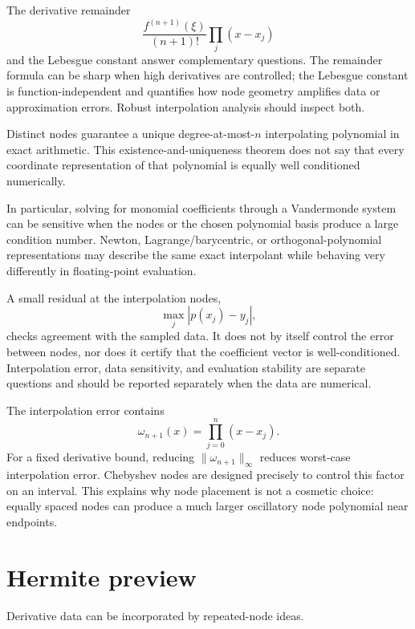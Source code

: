\begin{remark}
The derivative remainder
\[
\frac{f^{(n+1)}(\xi)}{(n+1)!}\prod_j(x-x_j)
\]
and the Lebesgue constant answer complementary questions. The remainder formula can be sharp when high derivatives are controlled; the Lebesgue constant is function-independent and quantifies how node geometry amplifies data or approximation errors. Robust interpolation analysis should inspect both.
\end{remark}

\begin{remark}
Distinct nodes guarantee a unique degree-at-most-\(n\) interpolating
polynomial in exact arithmetic.  This existence-and-uniqueness theorem does
not say that every coordinate representation of that polynomial is equally
well conditioned numerically.

In particular, solving for monomial coefficients through a Vandermonde system
can be sensitive when the nodes or the chosen polynomial basis produce a
large condition number.  Newton, Lagrange/barycentric, or orthogonal-polynomial
representations may describe the same exact interpolant while behaving very
differently in floating-point evaluation.

A small residual at the interpolation nodes,
\[
\max_j |p(x_j)-y_j|,
\]
checks agreement with the sampled data.  It does not by itself control the
error between nodes, nor does it certify that the coefficient vector is
well-conditioned.  Interpolation error, data sensitivity, and evaluation
stability are separate questions and should be reported separately when the
data are numerical.
\end{remark}


\begin{example}\label{ex:ii20-expand-03}
The interpolation error contains
\[
\omega_{n+1}(x)=\prod_{j=0}^n(x-x_j).
\]
For a fixed derivative bound, reducing
\(\|\omega_{n+1}\|_\infty\) reduces worst-case interpolation error. Chebyshev
nodes are designed precisely to control this factor on an interval. This
explains why node placement is not a cosmetic choice: equally spaced nodes can
produce a much larger oscillatory node polynomial near endpoints.
\end{example}
\section{Hermite preview}
Derivative data can be incorporated by repeated-node ideas.

